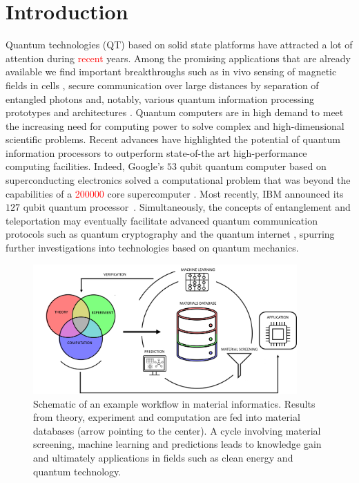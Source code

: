 \documentclass[superscriptaddress,unsortedaddress,
 amsmath,amssymb,
 aps,
]{revtex4-2}
\newcommand{\mrk}[1]{\textcolor{red}{#1}}
\begin{document}
\section*{Introduction}
Quantum technologies (QT) based on solid state platforms have attracted a lot of attention during \mrk{recent}  years. 
Among the promising applications that are already available we find important breakthroughs such as in vivo sensing of magnetic fields in cells \cite{Lesage_2013}, secure communication over large distances by separation of entangled photons \cite{Ursin2007} and, notably, various quantum information processing prototypes and architectures \cite{Arute_2019}.  
Quantum computers are in high demand to meet the increasing need for computing power to solve complex and high-dimensional scientific problems. Recent advances have highlighted the potential of quantum information processors to outperform state-of-the art high-performance computing facilities.
Indeed, Google's $53$ qubit quantum computer based on superconducting electronics solved a computational problem that was beyond the capabilities of a \mrk{\num{200000}} core supercomputer \cite{Arute_2019}.
Most recently, IBM announced its $127$ qubit quantum processor~\cite{IBM2021}. Simultaneously, the concepts of entanglement and teleportation may eventually facilitate advanced quantum communication protocols such as quantum cryptography and the quantum internet \cite{quantum-internet-kimble}, spurring further investigations into technologies based on quantum mechanics.

\begin{figure}[t]
    \centering
    \includegraphics[width=0.9\textwidth]{figures/ht-workflow-new-2.png}
    \caption{Schematic of an example workflow in material informatics. Results from theory, experiment and computation are fed into material databases (arrow pointing to the center). A cycle involving material screening, machine learning and predictions leads to knowledge gain and ultimately applications in fields such as clean energy and quantum technology. 
    }
    \label{fig:ht-workflow}
\end{figure}
\end{document}
